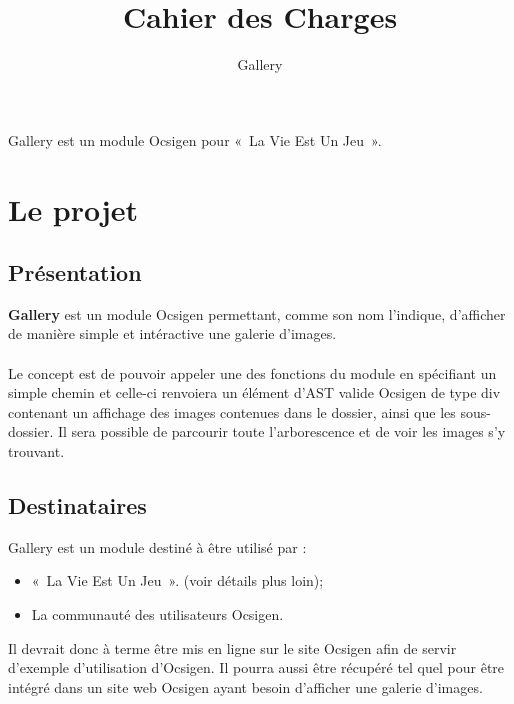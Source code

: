 \documentclass{life-fr}
\begin{document}
\title{Cahier des Charges}
\subtitle{Gallery}

\summary
{
  Gallery est un module Ocsigen pour «~La Vie Est Un Jeu~».
}

\maketitle
\tableofcontents


\chapter{Le projet}

\section{Présentation}

\textbf{Gallery} est un module Ocsigen permettant, comme son nom l'indique,
d'afficher de manière simple et intéractive une galerie d'images.\\
\\
Le concept est de pouvoir appeler une des fonctions du module en spécifiant
un simple chemin et celle-ci renvoiera un élément d'AST valide Ocsigen de
type div contenant un affichage des images contenues dans le dossier,
ainsi que les sous-dossier. Il sera possible de parcourir toute
l'arborescence et de voir les images s'y trouvant.

\section{Destinataires}

Gallery est un module destiné à être utilisé par :

\begin{itemize}
  \item «~La Vie Est Un Jeu~». (voir détails plus loin);
  \item La communauté des utilisateurs Ocsigen.
\end{itemize}

Il devrait donc à terme être mis en ligne sur le site Ocsigen afin de
servir d'exemple d'utilisation d'Ocsigen. Il pourra aussi être récupéré
tel quel pour être intégré dans un site web Ocsigen ayant besoin d'afficher
une galerie d'images.

\newpage
\end{document}
